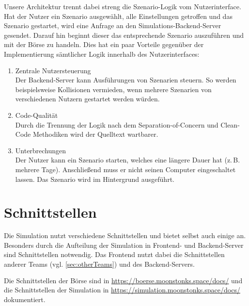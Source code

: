 Unsere Architektur trennt dabei streng die Szenario-Logik vom Nutzerinterface.
Hat der Nutzer ein Szenario ausgewählt, alle Einstellungen getroffen und das Szenario gestartet, wird eine Anfrage an den Simulations-Backend-Server gesendet. Darauf hin beginnt dieser das entsprechende Szenario auszuführen und mit der Börse zu handeln.
Dies hat ein paar Vorteile gegenüber der Implementierung sämtlicher Logik innerhalb des Nutzerinterfaces:
\begin{enumerate}
    \item Zentrale Nutzersteuerung\\
        Der Backend-Server kann Ausführungen von Szenarien steuern. So werden beispielsweise Kollisionen vermieden, wenn mehrere Szenarien von verschiedenen Nutzern gestartet werden würden.
    \item Code-Qualität\\
        Durch die Trennung der Logik nach dem Separation-of-Concern und Clean-Code Methodiken wird der Quelltext wartbarer.
    \item Unterbrechungen\\
        Der Nutzer kann ein Szenario starten, welches eine längere Dauer hat (z.\,B. mehrere Tage). Anschließend muss er nicht seinen Computer eingeschaltet lassen. Das Szenario wird im Hintergrund ausgeführt.
\end{enumerate}











\section{Schnittstellen}
Die Simulation nutzt verschiedene Schnittstellen und bietet selbst auch einige an. Besonders durch die Aufteilung der Simulation in Frontend- und Backend-Server sind Schnittstellen notwendig.
Das Frontend nutzt dabei die Schnittstellen anderer Teams (vgl. \autoref{sec:otherTeams}) und des Backend-Servers.

Die Schnittstellen der Börse sind in \href{https://boerse.moonstonks.space/docs/}{https://boerse.moonstonks.space/docs/} und die Schnittstellen der Simulation in \href{https://simulation.moonstonks.space/docs/}{https://simulation.moonstonks.space/docs/} dokumentiert.

